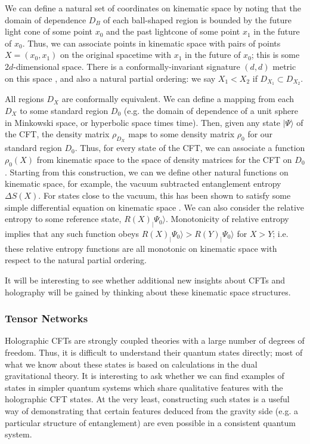 \documentclass[12pt,epsf]{article}
\begin{document}
We can define a natural set of coordinates on kinematic space by noting that the domain of dependence $D_B$ of each ball-shaped region is bounded by the future light cone of some point $x_0$ and the past lightcone of some point $x_1$ in the future of $x_0$. Thus, we can associate points in kinematic space with pairs of points $X = (x_0,x_1)$ on the original spacetime with $x_1$ in the future of $x_0$; this is some $2d$-dimensional space. There is a conformally-invariant signature $(d,d)$ metric on this space \cite{Czech:2016xec,deBoer:2016pqk}, and also a natural partial ordering: we say $X_1 < X_2$ if $D_{X_1} \subset D_{X_2}$.

All regions $D_X$ are conformally equivalent. We can define a mapping from each $D_X$ to some standard region $D_0$ (e.g. the domain of dependence of a unit sphere in Minkowski space, or hyperbolic space times time). Then, given any state $|\Psi \rangle$ of the CFT, the density matrix $\rho_{D_X}$ maps to some density matrix $\rho_0$ for our standard region $D_0$. Thus, for every state of the CFT, we can associate a function $\rho_0(X)$ from kinematic space to the space of density matrices for the CFT on $D_0$. Starting from this construction, we can we define other natural functions on kinematic space, for example, the vacuum subtracted entanglement entropy $\Delta S(X)$. For states close to the vacuum, this has been shown to satisfy some simple differential equation on kinematic space \cite{Czech:2016xec,deBoer:2016pqk}. We can also consider the relative entropy to some reference state, $R(X)_|\Psi_0 \rangle$. Monotonicity of relative entropy implies that any such function obeys $R(X)_|\Psi_0 \rangle > R(Y)_|\Psi_0 \rangle$ for $X > Y$; i.e. these relative entropy functions are all monotonic on kinematic space with respect to the natural partial ordering.

It will be interesting to see whether additional new insights about CFTs and holography will be gained by thinking about these kinematic space structures.

\subsubsection*{Tensor Networks}

Holographic CFTs are strongly coupled theories with a large number of degrees of freedom. Thus, it is difficult to understand their quantum states directly; most of what we know about these states is based on calculations in the dual gravitational theory. It is interesting to ask whether we can find examples of states in simpler quantum systems which share qualitative features with the holographic CFT states. At the very least, constructing such states is a useful way of demonstrating that certain features deduced from the gravity side (e.g. a particular structure of entanglement) are even possible in a consistent quantum system.
\end{document}
